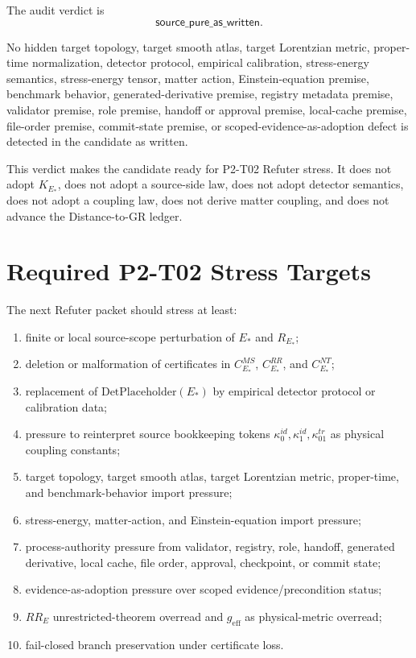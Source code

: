 \documentclass[11pt]{article}
\newcommand{\AuditVerdict}{\mathsf{source\_pure\_as\_written}}
\newcommand{\EStar}{E_{\ast}}
\newcommand{\DetPlaceholder}{\mathrm{DetPlaceholder}}
\newcommand{\KStar}{K_{E_{\ast}}}
\begin{document}
The audit verdict is
\[
  \AuditVerdict .
\]

No hidden target topology, target smooth atlas, target Lorentzian metric,
proper-time normalization, detector protocol, empirical calibration,
stress-energy semantics, stress-energy tensor, matter action,
Einstein-equation premise, benchmark behavior, generated-derivative premise,
registry metadata premise, validator premise, role premise, handoff or
approval premise, local-cache premise, file-order premise, commit-state
premise, or scoped-evidence-as-adoption defect is detected in the candidate as
written.

This verdict makes the candidate ready for P2-T02 Refuter stress. It does not
adopt \(\KStar\), does not adopt a source-side law, does not adopt detector
semantics, does not adopt a coupling law, does not derive matter coupling, and
does not advance the Distance-to-GR ledger.

\section{Required P2-T02 Stress Targets}

The next Refuter packet should stress at least:

\begin{enumerate}[label=(\alph*)]
  \item finite or local source-scope perturbation of \(\EStar\) and
        \(R_{\EStar}\);
  \item deletion or malformation of certificates in \(C^{MS}_{\EStar}\),
        \(C^{RR}_{\EStar}\), and \(C^{NT}_{\EStar}\);
  \item replacement of \(\DetPlaceholder(\EStar)\) by empirical detector
        protocol or calibration data;
  \item pressure to reinterpret source bookkeeping tokens
        \(\kappa^{id}_0,\kappa^{id}_1,\kappa^{tr}_{01}\) as physical
        coupling constants;
  \item target topology, target smooth atlas, target Lorentzian metric,
        proper-time, and benchmark-behavior import pressure;
  \item stress-energy, matter-action, and Einstein-equation import pressure;
  \item process-authority pressure from validator, registry, role, handoff,
        generated derivative, local cache, file order, approval, checkpoint,
        or commit state;
  \item evidence-as-adoption pressure over scoped evidence/precondition
        status;
  \item \(RR_E\) unrestricted-theorem overread and \(g_{\mathrm{eff}}\) as
        physical-metric overread;
  \item fail-closed branch preservation under certificate loss.
\end{enumerate}
\end{document}
